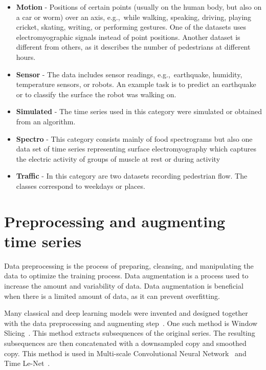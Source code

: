 \documentclass[a4paper,11pt,twoside]{report}
\theoremstyle{definition}
\begin{document}
\begin{itemize}
\item \textbf{Motion} - Positions of certain points (usually on the human body, but also on a car or worm) over an axis, e.g.,~while walking, speaking, driving, playing cricket, skating, writing, or performing gestures. One of the datasets uses electromyographic signals instead of point positions. Another dataset is different from others, as it describes the number of pedestrians at different hours.


\item \textbf{Sensor} - The data includes sensor readings, e.g.,~earthquake, humidity, temperature sensors, or robots. An example task is to predict an earthquake or to classify the surface the robot was walking on.

\item \textbf{Simulated} - The time series used in this category were simulated or obtained from an algorithm.

\item \textbf{Spectro} - This category consists mainly of food spectrograms but also one data set of time series representing  surface electromyography which captures the electric activity of groups of muscle at rest or during activity

\item \textbf{Traffic} - In this category are two datasets recording pedestrian flow. The classes correspond to weekdays or places.


\end{itemize}


\section{Preprocessing and augmenting time series}
Data preprocessing is the process of preparing, cleansing, and manipulating the data to optimize the training process. Data augmentation is a process used to increase the amount and variability of data. Data augmentation is beneficial when there is a limited amount of data, as it can prevent overfitting.

Many classical and deep learning models were invented and designed together with the data preprocessing and augmenting step~\cite{bake_off, dl_tsc}. One such method is Window Slicing~\cite{dl_tsc}. This method extracts subsequences of the original series. The resulting subsequences are then concatenated with a downsampled copy and smoothed copy. This method is used in Multi-scale Convolutional Neural Network~\cite{multiscale} and Time Le-Net~\cite{timelenet}.
\end{document}
